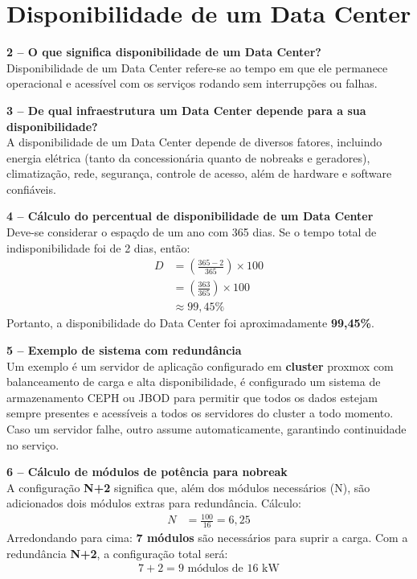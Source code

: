 \documentclass[a4paper]{article}
\begin{document}
\section{Disponibilidade de um Data Center}

\textbf{2 – O que significa disponibilidade de um Data Center?}  \\
Disponibilidade de um Data Center refere-se ao tempo em que ele permanece operacional e acessível com os serviços rodando sem interrupções ou falhas.

\textbf{3 – De qual infraestrutura um Data Center depende para a sua disponibilidade?}  \\
A disponibilidade de um Data Center depende de diversos fatores, incluindo energia elétrica (tanto da concessionária quanto de nobreaks e geradores), climatização, rede, segurança, controle de acesso, além de hardware e software confiáveis.

\textbf{4 – Cálculo do percentual de disponibilidade de um Data Center}  \\
Deve-se considerar o espaçdo de um ano com 365 dias. Se o tempo total de indisponibilidade foi de 2 dias, então:
\begin{align*}
    D &= \left( \frac{365 - 2}{365} \right) \times 100 \\
    &= \left( \frac{363}{365} \right) \times 100 \\
    &\approx 99,45\%
\end{align*}
Portanto, a disponibilidade do Data Center foi aproximadamente \textbf{99,45\%}.

\textbf{5 – Exemplo de sistema com redundância}  \\
Um exemplo é um servidor de aplicação configurado em \textbf{cluster} proxmox com balanceamento de carga e alta disponibilidade, é configurado um sistema de armazenamento CEPH ou JBOD para permitir que todos os dados estejam sempre presentes e acessíveis a todos os servidores do cluster a todo momento. Caso um servidor falhe, outro assume automaticamente, garantindo continuidade no serviço.

\textbf{6 – Cálculo de módulos de potência para nobreak}  \\
A configuração \textbf{N+2} significa que, além dos módulos necessários (N), são adicionados dois módulos extras para redundância.  
Cálculo:
\begin{align*}
    N &= \frac{100}{16} = 6,25
\end{align*}
Arredondando para cima: \textbf{7 módulos} são necessários para suprir a carga.  
Com a redundância \textbf{N+2}, a configuração total será:
\begin{align*}
    7 + 2 = 9 \text{ módulos de 16 kW}
\end{align*}
\end{document}
